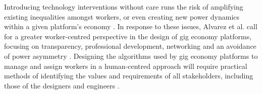 Introducing technology interventions without care runs the risk of amplifying existing inequalities amongst workers, or even creating new power dynamics within a given platform's economy \cite{martin2016}. In response to these issues, Alvarez et al. call for a greater worker-centred perspective in the design of gig economy platforms, focusing on transparency, professional development, networking and an avoidance of power asymmetry \cite{carlos2021}. Designing the algorithms used by gig economy platforms to manage and assign workers in a human-centred approach will require practical methods of identifying the values and requirements of all stakeholders, including those of the designers and engineers \cite{lee2015}.